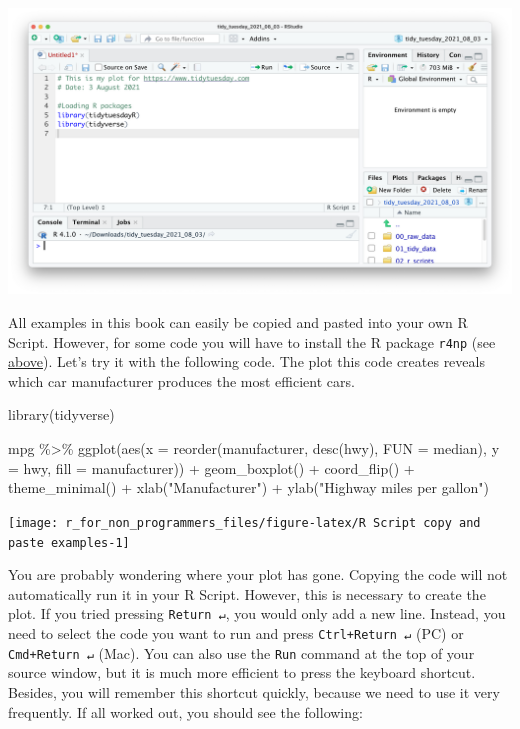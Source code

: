 \documentclass[
]{book}
\newenvironment{Shaded}{\begin{snugshade}}{\end{snugshade}}
\newcommand{\AttributeTok}[1]{\textcolor[rgb]{0.77,0.63,0.00}{#1}}
\newcommand{\FunctionTok}[1]{\textcolor[rgb]{0.00,0.00,0.00}{#1}}
\newcommand{\NormalTok}[1]{#1}
\newcommand{\SpecialCharTok}[1]{\textcolor[rgb]{0.00,0.00,0.00}{#1}}
\newcommand{\StringTok}[1]{\textcolor[rgb]{0.31,0.60,0.02}{#1}}
\begin{document}
\includegraphics{images/chapter_06_img/02_r_script/00_r_script.png}

All examples in this book can easily be copied and pasted into your own R Script. However, for some code you will have to install the R package \texttt{r4np} (see \protect\hyperlink{install_r4np}{above}). Let's try it with the following code. The plot this code creates reveals which car manufacturer produces the most efficient cars.

\begin{Shaded}
\begin{Highlighting}[]
\FunctionTok{library}\NormalTok{(tidyverse)}

\NormalTok{mpg }\SpecialCharTok{\%\textgreater{}\%} \FunctionTok{ggplot}\NormalTok{(}\FunctionTok{aes}\NormalTok{(}\AttributeTok{x =} \FunctionTok{reorder}\NormalTok{(manufacturer, }\FunctionTok{desc}\NormalTok{(hwy), }\AttributeTok{FUN =}\NormalTok{ median),}
                   \AttributeTok{y =}\NormalTok{ hwy,}
                   \AttributeTok{fill =}\NormalTok{ manufacturer)) }\SpecialCharTok{+}
  \FunctionTok{geom\_boxplot}\NormalTok{() }\SpecialCharTok{+}
  \FunctionTok{coord\_flip}\NormalTok{() }\SpecialCharTok{+}
  \FunctionTok{theme\_minimal}\NormalTok{() }\SpecialCharTok{+}
  \FunctionTok{xlab}\NormalTok{(}\StringTok{"Manufacturer"}\NormalTok{) }\SpecialCharTok{+}
  \FunctionTok{ylab}\NormalTok{(}\StringTok{"Highway miles per gallon"}\NormalTok{)}
\end{Highlighting}
\end{Shaded}

\begin{center}\texttt{[image: r\_for\_non\_programmers\_files/figure-latex/R Script copy and paste examples-1]} \end{center}

You are probably wondering where your plot has gone. Copying the code will not automatically run it in your R Script. However, this is necessary to create the plot. If you tried pressing \texttt{Return\ ↵}, you would only add a new line. Instead, you need to select the code you want to run and press \texttt{Ctrl+Return\ ↵} (PC) or \texttt{Cmd+Return\ ↵} (Mac). You can also use the \texttt{Run} command at the top of your source window, but it is much more efficient to press the keyboard shortcut. Besides, you will remember this shortcut quickly, because we need to use it very frequently. If all worked out, you should see the following:
\end{document}
